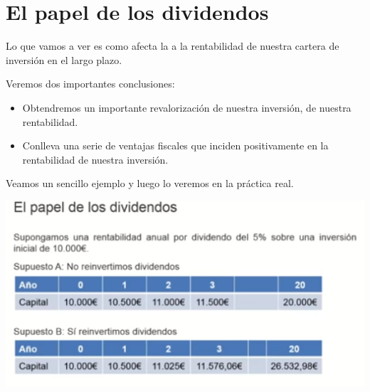 \section{El papel de los dividendos}

Lo que vamos a ver es como afecta la  a la rentabilidad de nuestra cartera de inversión en el largo plazo.

Veremos dos importantes conclusiones:

\begin{itemize}
    \item Obtendremos un importante revalorización de nuestra inversión, de nuestra rentabilidad.
    \item Conlleva una serie de ventajas fiscales que inciden positivamente en la rentabilidad de nuestra inversión.
\end{itemize}

Veamos un sencillo ejemplo y luego lo veremos en la práctica real.

\begin{center}
    \includegraphics[scale=.90]{images/papel-dividendos.png}
\end{center}

